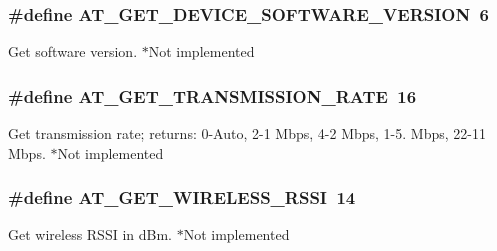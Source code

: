 \subsubsection[{\texorpdfstring{A\+T\+\_\+\+G\+E\+T\+\_\+\+D\+E\+V\+I\+C\+E\+\_\+\+S\+O\+F\+T\+W\+A\+R\+E\+\_\+\+V\+E\+R\+S\+I\+ON}{AT_GET_DEVICE_SOFTWARE_VERSION}}]{\setlength{\rightskip}{0pt plus 5cm}\#define A\+T\+\_\+\+G\+E\+T\+\_\+\+D\+E\+V\+I\+C\+E\+\_\+\+S\+O\+F\+T\+W\+A\+R\+E\+\_\+\+V\+E\+R\+S\+I\+ON~6}\hypertarget{group__wireless__interface_ga3ac550900ff9217c2f2b4cc7dd2a9355}{}\label{group__wireless__interface_ga3ac550900ff9217c2f2b4cc7dd2a9355}
Get software version. $\ast$\+Not implemented 
\subsubsection[{\texorpdfstring{A\+T\+\_\+\+G\+E\+T\+\_\+\+T\+R\+A\+N\+S\+M\+I\+S\+S\+I\+O\+N\+\_\+\+R\+A\+TE}{AT_GET_TRANSMISSION_RATE}}]{\setlength{\rightskip}{0pt plus 5cm}\#define A\+T\+\_\+\+G\+E\+T\+\_\+\+T\+R\+A\+N\+S\+M\+I\+S\+S\+I\+O\+N\+\_\+\+R\+A\+TE~16}\hypertarget{group__wireless__interface_ga3a7895a03de540287912366190323978}{}\label{group__wireless__interface_ga3a7895a03de540287912366190323978}
Get transmission rate; returns\+: 0-\/\+Auto, 2-\/1 Mbps, 4-\/2 Mbps, 1-\/5. Mbps, 22-\/11 Mbps. $\ast$\+Not implemented 
\subsubsection[{\texorpdfstring{A\+T\+\_\+\+G\+E\+T\+\_\+\+W\+I\+R\+E\+L\+E\+S\+S\+\_\+\+R\+S\+SI}{AT_GET_WIRELESS_RSSI}}]{\setlength{\rightskip}{0pt plus 5cm}\#define A\+T\+\_\+\+G\+E\+T\+\_\+\+W\+I\+R\+E\+L\+E\+S\+S\+\_\+\+R\+S\+SI~14}\hypertarget{group__wireless__interface_gafdc5154c3f102e6959536bc384c03420}{}\label{group__wireless__interface_gafdc5154c3f102e6959536bc384c03420}
Get wireless R\+S\+SI in d\+Bm. $\ast$\+Not implemented 
